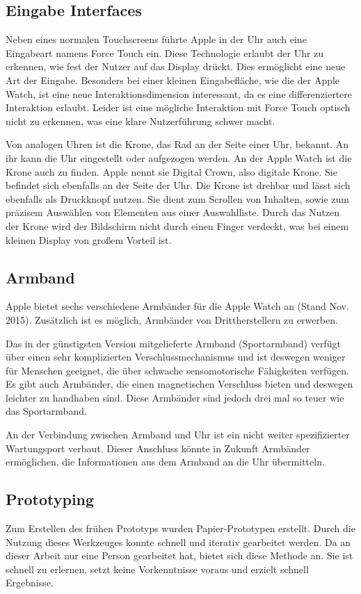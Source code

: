 \subsection{Eingabe Interfaces}
\label{ch:eingabe_interface}
Neben eines normalen Touchscreens führte Apple in der Uhr auch eine Eingabeart namens Force Touch ein. Diese Technologie erlaubt der Uhr zu erkennen, wie fest der Nutzer auf das Display drückt. Dies ermöglicht eine neue Art der Eingabe. Besonders bei einer kleinen Eingabefläche, wie die der Apple Watch, ist eine neue Interaktionsdimension interessant, da es eine differenziertere Interaktion erlaubt. Leider ist eine mögliche Interaktion mit Force Touch optisch nicht zu erkennen, was eine klare Nutzerführung schwer macht.

 Von analogen Uhren ist die Krone, das Rad an der Seite einer Uhr, bekannt. An ihr kann die Uhr eingestellt oder aufgezogen werden. An der Apple Watch ist die Krone auch zu finden. Apple nennt sie \glqq Digital Crown\grqq, also digitale Krone. Sie befindet sich ebenfalls an der Seite der Uhr. Die Krone ist drehbar und lässt sich ebenfalls als Druckknopf nutzen. Sie dient zum Scrollen von Inhalten, sowie zum präzisem Auswählen von Elementen aus einer Auswahlliste. Durch das Nutzen der Krone wird der Bildschirm nicht durch einen Finger verdeckt, was bei einem kleinen Display von großem Vorteil ist.
\subsection{Armband}
Apple bietet sechs verschiedene Armbänder für die Apple Watch an (Stand Nov. 2015). Zusätzlich ist es möglich, Armbänder von Drittherstellern zu erwerben. 

Das in der günstigsten Version mitgelieferte Armband (Sportarmband) verfügt über einen sehr komplizierten Verschlussmechanismus und ist deswegen weniger für Menschen geeignet, die über schwache sensomotorische Fähigkeiten verfügen. Es gibt auch Armbänder, die einen magnetischen Verschluss bieten und deswegen leichter zu handhaben sind. Diese Armbänder sind jedoch drei mal so teuer wie das Sportarmband.

An der Verbindung zwischen Armband und Uhr ist ein nicht weiter spezifizierter Wartungsport verbaut. Dieser Anschluss könnte in Zukunft Armbänder ermöglichen, die Informationen aus dem Armband an die Uhr übermitteln.
\subsection{Prototyping}
Zum Erstellen des frühen Prototyps wurden Papier-Prototypen erstellt. Durch die Nutzung dieses Werkzeuges konnte schnell und iterativ gearbeitet werden. Da an dieser Arbeit nur eine Person gearbeitet hat, bietet sich diese Methode an. Sie ist schnell zu erlernen, setzt keine Vorkenntnisse voraus und erzielt schnell Ergebnisse.


